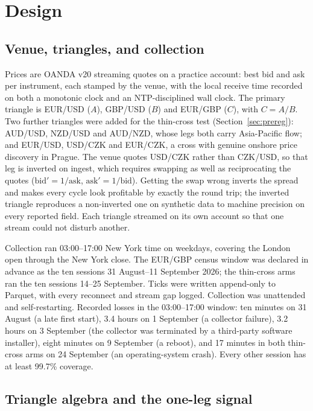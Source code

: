 \documentclass[11pt]{article}
\begin{document}
\section{Design}\label{sec:design}

\subsection{Venue, triangles, and collection}

Prices are OANDA v20 streaming quotes on a practice account: best bid
and ask per instrument, each stamped by the venue, with the local
receive time recorded on both a monotonic clock and an NTP-disciplined
wall clock. The primary triangle is EUR/USD ($A$), GBP/USD ($B$) and
EUR/GBP ($C$), with $C = A/B$. Two further triangles were added for the
thin-cross test (Section~\ref{sec:prereg}): AUD/USD, NZD/USD and AUD/NZD,
whose legs both carry Asia-Pacific flow; and EUR/USD, USD/CZK and
EUR/CZK, a cross with genuine onshore price discovery in Prague. The
venue quotes USD/CZK rather than CZK/USD, so that leg is inverted on
ingest, which requires swapping as well as reciprocating the quotes
($\text{bid}' = 1/\text{ask}$, $\text{ask}' = 1/\text{bid}$). Getting
the swap wrong inverts the spread and makes every cycle look profitable
by exactly the round trip; the inverted triangle reproduces a
non-inverted one on synthetic data to machine precision on every
reported field. Each triangle streamed on its own account so that one
stream could not disturb another.

Collection ran 03:00--17:00 New York time on weekdays, covering the
London open through the New York close. The EUR/GBP census window was
declared in advance as the ten sessions 31 August--11 September 2026;
the thin-cross arms ran the ten sessions 14--25 September. Ticks were
written append-only to Parquet, with every reconnect and stream gap
logged. Collection was unattended and self-restarting. Recorded losses in the
03:00--17:00 window: ten minutes on 31 August (a late first start),
3.4 hours on 1 September (a collector failure), 3.2 hours on 3
September (the collector was terminated by a third-party software
installer), eight minutes on 9 September (a reboot), and 17 minutes in
both thin-cross arms on 24 September (an operating-system crash). Every
other session has at least 99.7\% coverage.

\subsection{Triangle algebra and the one-leg signal}
\end{document}
